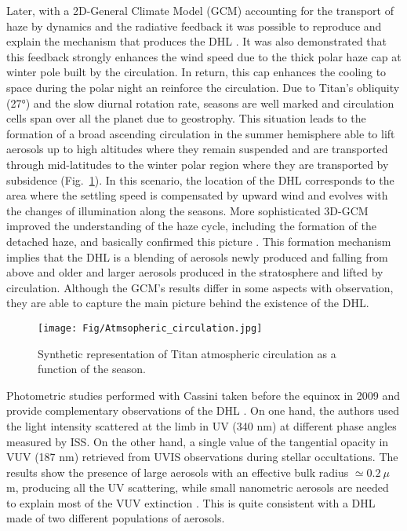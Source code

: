 Later, with a 2D-General Climate Model (GCM) accounting for the transport of haze by dynamics and the radiative
feedback it was possible to reproduce and explain the mechanism that produces the DHL \citep{Rannou2002}. It was also
demonstrated that this feedback strongly enhances the wind speed due to the thick polar haze cap at winter pole built
by the circulation. In return, this cap enhances the cooling to space during the polar night \citep{Rannou2004} an
reinforce the circulation. Due to Titan's obliquity (\ang{27}) and the slow diurnal rotation rate, seasons are well
marked and circulation cells span over all the planet due to geostrophy. This situation leads to the formation of a
broad ascending circulation in the summer hemisphere able to lift aerosols up to high altitudes where they remain
suspended and are transported through mid-latitudes to the winter polar region where they are transported by
subsidence (Fig.~\ref{fig:titan_atm_circulation}). In this scenario, the location of the DHL corresponds to the area
where the settling speed is compensated by upward wind and evolves with the changes of illumination along the seasons.
More sophisticated 3D-GCM improved the understanding of the haze cycle, including the formation of the detached haze,
and basically confirmed this picture \citep{Lebonnois2012,Larson2015}. This formation mechanism implies that the DHL
is a blending of aerosols newly produced and falling from above and older and larger aerosols produced in the
stratosphere and lifted by circulation.
Although the GCM's results differ in some aspects with observation, they are able to capture the main picture behind
the existence of the DHL.

\begin{figure}[!ht]
    \centering
    \texttt{[image: Fig/Atmsopheric\_circulation.jpg]}  %
    \caption{Synthetic representation of Titan atmospheric circulation as a function of the season.}
    \label{fig:titan_atm_circulation}
\end{figure}

Photometric studies performed with Cassini taken before the equinox in 2009 and provide complementary observations
of the DHL \citep{Cours2011, Koskinen2011, Seignovert2017}.
On one hand, the authors used the light intensity scattered at the limb in UV (340 nm)
at different phase angles measured by ISS. On the other hand, a single value of the tangential opacity in VUV (187 nm)
retrieved from UVIS observations during stellar occultations.
The results show the presence of large aerosols with an effective bulk radius $\simeq 0.2\ \mu$m,
producing all the UV scattering, while small nanometric aerosols are needed to explain most of the VUV
extinction \citep{Cours2011}. This is quite consistent with a DHL made of two different populations of
aerosols.

